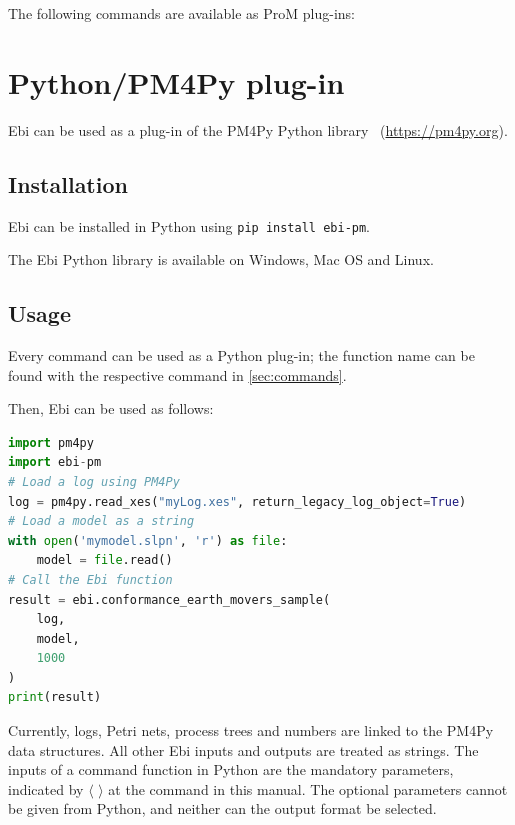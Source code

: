 \documentclass{book}
\begin{document}
		The following commands are available as ProM plug-ins:
		\promcommands

    \section{Python/PM4Py plug-in}
        Ebi can be used as a plug-in of the PM4Py Python library~\cite{DBLP:journals/simpa/BertiZS23} (\url{https://pm4py.org}).
        
        \subsection*{Installation}
            Ebi can be installed in Python using \verb=pip install ebi-pm=.

            The Ebi Python library is available on Windows, Mac OS and Linux. 


        \subsection*{Usage}
            Every command can be used as a Python plug-in; the function name can be found with the respective command in \cref{sec:commands}.
        
            Then, Ebi can be used as follows:
            \begin{lstlisting}[language=python, style=boxed]
import pm4py
import ebi-pm
# Load a log using PM4Py
log = pm4py.read_xes("myLog.xes", return_legacy_log_object=True)
# Load a model as a string
with open('mymodel.slpn', 'r') as file:
    model = file.read()
# Call the Ebi function
result = ebi.conformance_earth_movers_sample(
    log,
    model,
    1000
)
print(result)\end{lstlisting}

            Currently, logs, Petri nets, process trees and numbers are linked to the PM4Py data structures.
            All other Ebi inputs and outputs are treated as strings.
            The inputs of a command function in Python are the mandatory parameters, indicated by $\langle$ $\rangle$ at the command in this manual.
            The optional parameters cannot be given from Python, and neither can the output format be selected.
\end{document}
